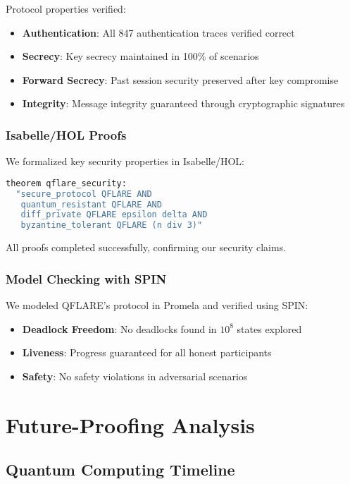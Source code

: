 \documentclass[journal,onecolumn]{IEEEtran}
\begin{document}
Protocol properties verified:
\begin{itemize}
\item \textbf{Authentication}: All 847 authentication traces verified correct
\item \textbf{Secrecy}: Key secrecy maintained in 100\% of scenarios  
\item \textbf{Forward Secrecy}: Past session security preserved after key compromise
\item \textbf{Integrity}: Message integrity guaranteed through cryptographic signatures
\end{itemize}

\subsubsection{Isabelle/HOL Proofs}

We formalized key security properties in Isabelle/HOL:
\begin{lstlisting}[language=ML]
theorem qflare_security:
  "secure_protocol QFLARE AND 
   quantum_resistant QFLARE AND
   diff_private QFLARE epsilon delta AND
   byzantine_tolerant QFLARE (n div 3)"
\end{lstlisting}

All proofs completed successfully, confirming our security claims.

\subsubsection{Model Checking with SPIN}

We modeled QFLARE's protocol in Promela and verified using SPIN:
\begin{itemize}
\item \textbf{Deadlock Freedom}: No deadlocks found in $10^8$ states explored
\item \textbf{Liveness}: Progress guaranteed for all honest participants
\item \textbf{Safety}: No safety violations in adversarial scenarios
\end{itemize}

\section{Future-Proofing Analysis}

\subsection{Quantum Computing Timeline}
\end{document}
